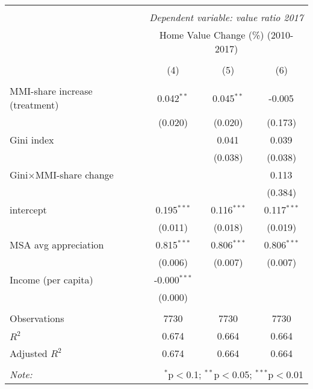 \documentclass[11pt]{article}
\makeatletter
\newcommand{\boxspacing}{\kern\kvtcb@left@rule\kern\kvtcb@boxsep}
\newcommand{\prompt}[4]{
        {\ttfamily\llap{{\color{#2}[#3]:\hspace{3pt}#4}}\vspace{-\baselineskip}}
    }
\makeatother
\begin{document}
            \begin{tcolorbox}[breakable, size=fbox, boxrule=.5pt, pad at break*=1mm, opacityfill=0]
\prompt{Out}{outcolor}{38}{\boxspacing}
\end{tcolorbox}
\begin{table}[H] \centering
    \begin{tabular}{@{\extracolsep{5pt}}lccc}
    \\[-1.8ex]\hline
    \hline \\[-1.8ex]
    & \multicolumn{3}{c}{\textit{Dependent variable: value ratio 2017}} \
    \cr \cline{2-4}
    \\[-1.8ex] & \multicolumn{3}{c}{Home Value Change (\%) (2010-2017)}  \\
    \\[-1.8ex] & (4) & (5) & (6) \\
    \hline \\[-1.8ex]
    MMI-share increase (treatment) & 0.042$^{**}$ & 0.045$^{**}$ & -0.005$^{}$ \\
    & (0.020) & (0.020) & (0.173) \\
     Gini index & & 0.041$^{}$ & 0.039$^{}$ \\
    & & (0.038) & (0.038) \\
     Gini$\times$MMI-share change & & & 0.113$^{}$ \\
    & & & (0.384) \\
     intercept & 0.195$^{***}$ & 0.116$^{***}$ & 0.117$^{***}$ \\
    & (0.011) & (0.018) & (0.019) \\
     MSA avg appreciation & 0.815$^{***}$ & 0.806$^{***}$ & 0.806$^{***}$ \\
    & (0.006) & (0.007) & (0.007) \\
     Income (per capita) & -0.000$^{***}$ & & \\
    & (0.000) & & \\
    \hline \\[-1.8ex]
     Observations & 7730 & 7730 & 7730 \\
     $R^2$ & 0.674 & 0.664 & 0.664 \\
     Adjusted $R^2$ & 0.674 & 0.664 & 0.664 \\
    \hline
    \hline \\[-1.8ex]
    \textit{Note:} & \multicolumn{3}{r}{$^{*}$p$<$0.1; $^{**}$p$<$0.05; $^{***}$p$<$0.01} \\
    \end{tabular}
    \end{table}
\end{document}

